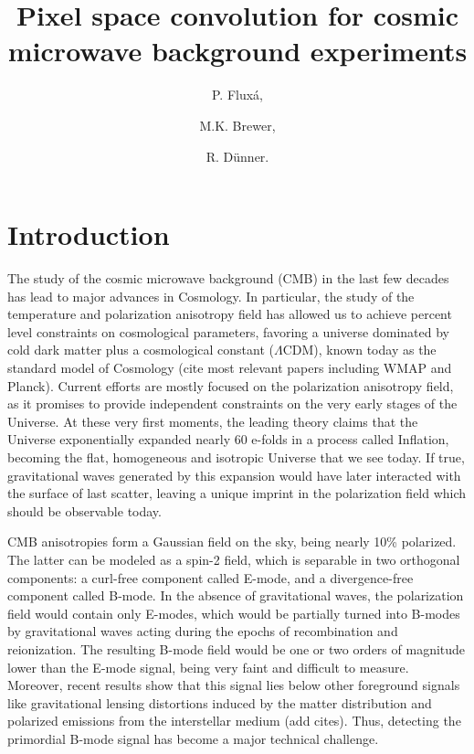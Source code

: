 \documentclass[a4paper,11pt]{article}
\title{\boldmath Pixel space convolution for cosmic microwave background experiments}
\author[a]{P. Flux\'a, }
\author[b]{M.K. Brewer, }
\author[a]{R. D\"unner.}
\affiliation[a]{Instituto de Astrof\'isica, Pontificia Universidad Cat\'olica de Chile ,\\Vicu\~na Mackenna 4860, Chile}
\affiliation[b]{Department of Astronomy, Johns Hopkins University,\\Baltimore MD, USA}
\begin{document}
\maketitle
\flushbottom


\section{Introduction}

\showthe\textwidth

The study of the cosmic microwave background (CMB) in the last few decades has lead to major advances in Cosmology. In particular, the study of the temperature and polarization anisotropy field has allowed us to achieve percent level constraints on cosmological parameters, favoring a universe dominated by cold dark matter plus a cosmological constant ($\Lambda$CDM), known today as the standard model of Cosmology {\color{red} (cite most relevant papers including WMAP and Planck)}. Current efforts are mostly focused on the polarization anisotropy field, as it promises to provide independent constraints on the very early stages of the Universe. At these very first moments, the leading theory claims that the Universe exponentially expanded nearly 60 e-folds in a process called Inflation, becoming the flat, homogeneous and isotropic Universe that we see today. If true, gravitational waves generated by this expansion would have later interacted with the surface of last scatter, leaving a unique imprint in the polarization field which should be observable today.

CMB anisotropies form a Gaussian field on the sky, being nearly 10\% polarized. The latter can be modeled as a spin-2 field, which is separable in two orthogonal components: a curl-free component called E-mode, and a divergence-free component called B-mode. In the absence of gravitational waves, the polarization field would contain only E-modes, which would be partially turned into B-modes by gravitational waves acting during the epochs of recombination and reionization. The resulting B-mode field would be one or two orders of magnitude lower than the E-mode signal, being very faint and difficult to measure. Moreover, recent results show that this signal lies below other foreground signals like gravitational lensing distortions induced by the matter distribution and polarized emissions from the interstellar medium {\color{red}(add cites)}. Thus, detecting the primordial B-mode signal has become a major technical challenge.
\end{document}
